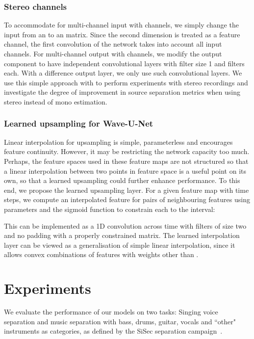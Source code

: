 \documentclass{article}
\begin{document}
\subsubsection{Stereo channels}
\label{sec:model_improv_stereo}

To accommodate for multi-channel input with  channels, we simply change the input  from an  to an  matrix. Since the second dimension is treated as a feature channel, the first convolution of the network takes into account all input channels.
For multi-channel output with  channels, we modify the output component to have  independent convolutional layers with filter size 1 and  filters each.
With a difference output layer, we only use  such convolutional layers.
We use this simple approach with  to perform experiments with stereo recordings and investigate the degree of improvement in source separation metrics when using stereo instead of mono estimation.

\subsubsection{Learned upsampling for Wave-U-Net}
\label{sec:model_improv_upsampling}

Linear interpolation for upsampling is simple, parameterless and encourages feature continuity.
However, it may be restricting the network capacity too much.
Perhaps, the feature spaces used in these feature maps are not structured so that a linear interpolation between two points in feature space is a useful point on its own, so that a learned upsampling could further enhance performance.
To this end, we propose the learned upsampling layer.
For a given  feature map with  time steps, we compute an interpolated feature  for pairs of neighbouring features  using parameters  and the sigmoid function  to constrain each  to the  interval:

This can be implemented as a 1D convolution across time with  filters of size two and no padding with a properly constrained matrix.
The learned interpolation layer can be viewed as a generalisation of simple linear interpolation, since it allows convex combinations of features with weights other than .

\section{Experiments}
\label{sec:experiment}

We evaluate the performance of our models on two tasks: Singing voice separation and music separation with bass, drums, guitar, vocals and ``other" instruments as categories, as defined by the SiSec separation campaign~\cite{Liutkus2017}.
\end{document}
